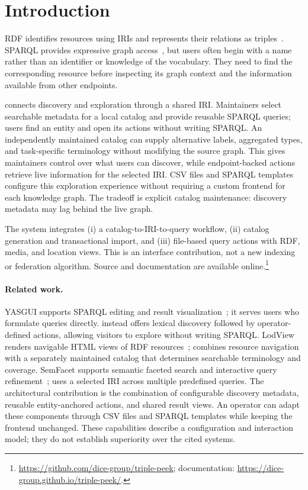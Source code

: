 \section{Introduction}
RDF identifies resources using IRIs and represents their relations as triples~\cite{rdf11}. SPARQL provides expressive graph access~\cite{sparql11}, but users often begin with a name rather than an identifier or knowledge of the vocabulary. They need to find the corresponding resource before inspecting its graph context and the information available from other endpoints.

\tp{} connects discovery and exploration through a shared IRI. Maintainers select searchable metadata for a local catalog and provide reusable SPARQL queries; users find an entity and open its actions without writing SPARQL. An independently maintained catalog can supply alternative labels, aggregated types, and task-specific terminology without modifying the source graph. This gives maintainers control over what users can discover, while endpoint-backed actions retrieve live information for the selected IRI. CSV files and SPARQL templates configure this exploration experience without requiring a custom frontend for each knowledge graph. The tradeoff is explicit catalog maintenance: discovery metadata may lag behind the live graph.

The system integrates (i) a catalog-to-IRI-to-query workflow, (ii) catalog generation and transactional import, and (iii) file-based query actions with RDF, media, and location views. This is an interface contribution, not a new indexing or federation algorithm. Source and documentation are available online.\footnote{\url{https://github.com/dice-group/triple-peek}; documentation: \url{https://dice-group.github.io/triple-peek/}.}

\paragraph{Related work.}
YASGUI supports SPARQL editing and result visualization~\cite{yasgui2017}; it serves users who formulate queries directly. \tp{} instead offers lexical discovery followed by operator-defined actions, allowing visitors to explore without writing SPARQL. LodView renders navigable HTML views of RDF resources~\cite{lodview}; \tp{} combines resource navigation with a separately maintained catalog that determines searchable terminology and coverage. SemFacet supports semantic faceted search and interactive query refinement~\cite{semfacet2014}; \tp{} uses a selected IRI across multiple predefined queries. The architectural contribution is the combination of configurable discovery metadata, reusable entity-anchored actions, and shared result views. An operator can adapt these components through CSV files and SPARQL templates while keeping the frontend unchanged. These capabilities describe a configuration and interaction model; they do not establish superiority over the cited systems.

